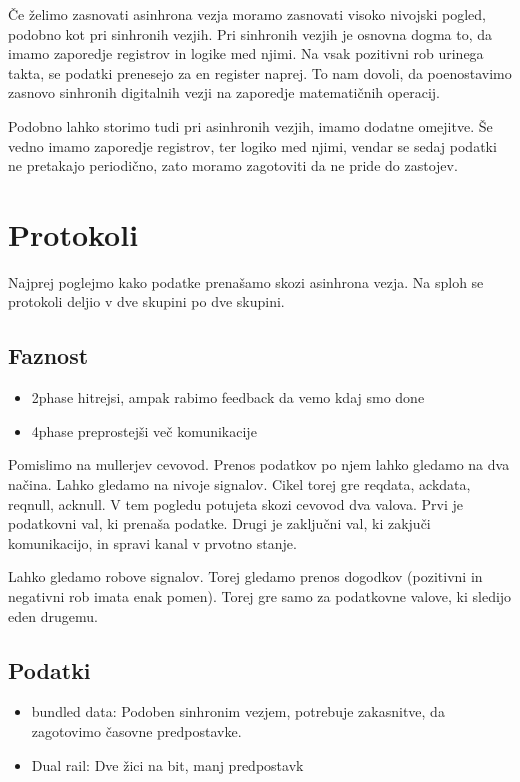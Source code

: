 
Če želimo zasnovati asinhrona vezja moramo zasnovati visoko nivojski pogled, podobno kot pri sinhronih vezjih. Pri sinhronih vezjih je osnovna dogma to, da imamo zaporedje registrov in logike med njimi. Na vsak pozitivni rob urinega takta, se podatki prenesejo za en register naprej. To nam dovoli, da poenostavimo zasnovo sinhronih digitalnih vezji na zaporedje matematičnih operacij.

Podobno lahko storimo tudi pri asinhronih vezjih, imamo dodatne omejitve. Še vedno imamo zaporedje registrov, ter logiko med njimi, vendar se sedaj podatki ne pretakajo periodično, zato moramo zagotoviti da ne pride do zastojev.

\section{Protokoli} \label{a}

Najprej poglejmo kako podatke prenašamo skozi asinhrona vezja. Na sploh se protokoli deljio v dve skupini po dve skupini.

\subsection{Faznost} \label{b}

\begin{itemize}
	\item 2phase hitrejsi, ampak rabimo feedback da vemo kdaj smo done
	\item 4phase preprostejši več komunikacije
\end{itemize}

Pomislimo na mullerjev cevovod. Prenos podatkov po njem lahko gledamo na dva načina.
Lahko gledamo na nivoje signalov. Cikel torej gre reqdata, ackdata, reqnull, acknull. V tem pogledu potujeta skozi cevovod dva valova. Prvi je podatkovni val, ki prenaša podatke. Drugi je zaključni val, ki zakjuči komunikacijo, in spravi kanal v prvotno stanje.

Lahko gledamo robove signalov. Torej gledamo prenos dogodkov (pozitivni in negativni rob imata enak pomen). Torej gre samo za podatkovne valove, ki sledijo eden drugemu.


\subsection{Podatki} \label{b}

\begin{itemize}
	\item bundled data: Podoben sinhronim vezjem, potrebuje zakasnitve, da zagotovimo časovne predpostavke.
	\item Dual rail: Dve žici na bit, manj predpostavk
\end{itemize}

